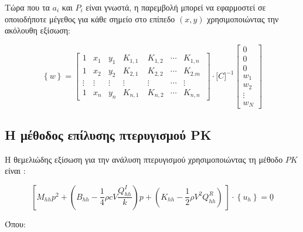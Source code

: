 Τώρα που τα $a_{i}$ και $P_{i}$ είναι γνωστά, η παρεμβολή μπορεί να εφαρμοστεί σε οποιοδήποτε μέγεθος για κάθε σημείο στο επίπεδο $(x,y)$ χρησιμοποιώντας την ακόλουθη εξίσωση:

\begin{equation}
\left\{ w \right\} = \begin{bmatrix}
1 & x_{1} & y_{1} & K_{1,1} & K_{1,2} & \cdots & K_{1,n} \\
1 & x_{2} & y_{2} & K_{2,1} & K_{2,2} & \cdots & K_{2.m} \\
 \vdots & \vdots & \vdots & \vdots & \vdots & \cdots & \vdots \\
1 & x_{n} & y_{n} & K_{n,1}\  & K_{n,2} & \cdots & K_{n,n}\ 
\end{bmatrix} \cdot \lbrack C\rbrack^{- 1}\begin{bmatrix}
0 \\
0 \\
0 \\
w_{1} \\
w_{2} \\
 \vdots \\
w_{N}
\end{bmatrix}
\end{equation}

\subsection{Η μέθοδος επίλυσης πτερυγισμού \textlatin{PK}}
\label{the-pk-method-of-flutter-solution}

Η θεμελιώδης εξίσωση για την ανάλυση πτερυγισμού χρησιμοποιώντας τη μέθοδο $PK$ είναι \cite{msc2021}:

\begin{equation}
\left\lbrack M_{hh}p^{2} + \left( B_{hh} - \frac{1}{4}\rho cV\frac{Q_{hh}^{I}}{k} \right)p + \left( K_{hh} - \frac{1}{2}\rho V^{2}Q_{hh}^{R} \right)\  \right\rbrack \cdot \left\{ u_{h} \right\} = \underline{0}
\end{equation}


Όπου:

